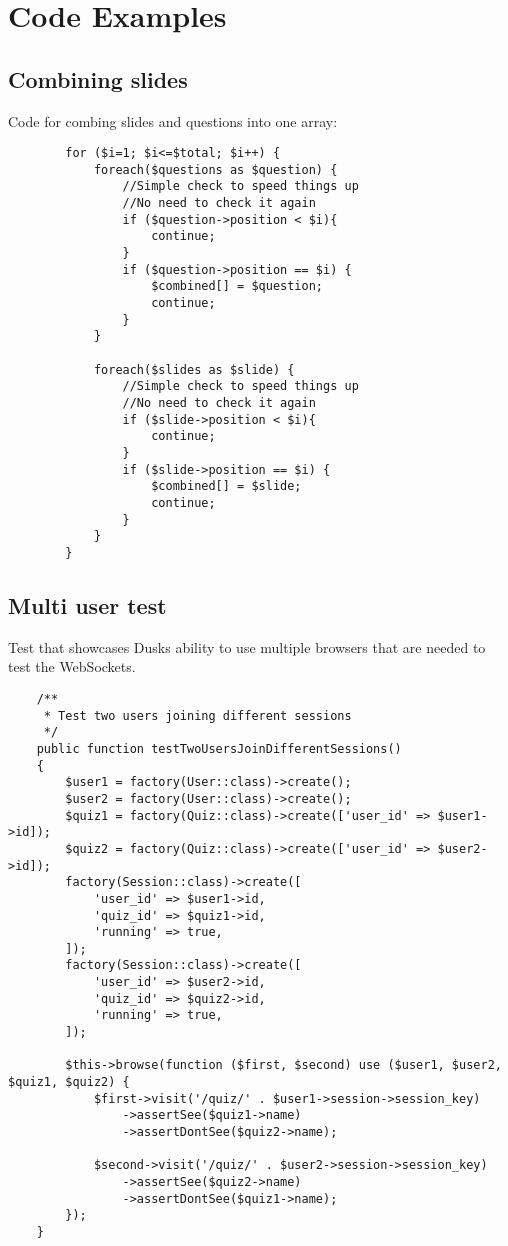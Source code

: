 \chapter{Code Examples}
\label{appendix:code}
\section{Combining slides}
Code for combing slides and questions into one array:
\begin{verbatim}
        for ($i=1; $i<=$total; $i++) {
            foreach($questions as $question) {
                //Simple check to speed things up
                //No need to check it again
                if ($question->position < $i){
                    continue;
                }
                if ($question->position == $i) {
                    $combined[] = $question;
                    continue;
                }
            }

            foreach($slides as $slide) {
                //Simple check to speed things up
                //No need to check it again
                if ($slide->position < $i){
                    continue;
                }
                if ($slide->position == $i) {
                    $combined[] = $slide;
                    continue;
                }
            }
        }
\end{verbatim}
\newpage

\section{Multi user test}
Test that showcases Dusks ability to use multiple browsers that are needed to test the WebSockets.
\begin{verbatim}
    /**
     * Test two users joining different sessions
     */
    public function testTwoUsersJoinDifferentSessions()
    {
        $user1 = factory(User::class)->create();
        $user2 = factory(User::class)->create();
        $quiz1 = factory(Quiz::class)->create(['user_id' => $user1->id]);
        $quiz2 = factory(Quiz::class)->create(['user_id' => $user2->id]);
        factory(Session::class)->create([
            'user_id' => $user1->id,
            'quiz_id' => $quiz1->id,
            'running' => true,
        ]);
        factory(Session::class)->create([
            'user_id' => $user2->id,
            'quiz_id' => $quiz2->id,
            'running' => true,
        ]);
        
        $this->browse(function ($first, $second) use ($user1, $user2, $quiz1, $quiz2) {
            $first->visit('/quiz/' . $user1->session->session_key)
                ->assertSee($quiz1->name)
                ->assertDontSee($quiz2->name);

            $second->visit('/quiz/' . $user2->session->session_key)
                ->assertSee($quiz2->name)
                ->assertDontSee($quiz1->name);
        });
    }
\end{verbatim}
\newpage

